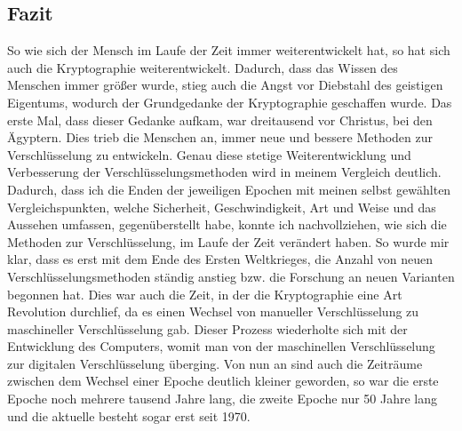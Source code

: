 \subsection{Fazit}
So wie sich der Mensch im Laufe der Zeit immer weiterentwickelt hat, so hat sich auch die Kryptographie weiterentwickelt. Dadurch, dass das Wissen des Menschen immer größer wurde, stieg auch die Angst vor Diebstahl des geistigen Eigentums, wodurch der Grundgedanke der Kryptographie geschaffen wurde. Das erste Mal, dass dieser Gedanke aufkam, war dreitausend vor Christus, bei den Ägyptern. Dies trieb die Menschen an, immer neue und bessere Methoden zur Verschlüsselung zu entwickeln. Genau diese stetige Weiterentwicklung und Verbesserung der Verschlüsselungsmethoden wird in meinem Vergleich deutlich. Dadurch, dass ich die Enden der jeweiligen Epochen mit meinen selbst gewählten Vergleichspunkten, welche Sicherheit, Geschwindigkeit, Art und Weise und das Aussehen umfassen, gegenüberstellt habe, konnte ich nachvollziehen, wie sich die Methoden zur Verschlüsselung, im Laufe der Zeit verändert haben. So wurde mir klar, dass es erst mit dem Ende des Ersten Weltkrieges, die Anzahl von neuen Verschlüsselungsmethoden ständig anstieg bzw. die Forschung an neuen Varianten begonnen hat. Dies war auch die Zeit, in der die Kryptographie eine Art Revolution durchlief, da es einen Wechsel von manueller Verschlüsselung zu maschineller Verschlüsselung gab. Dieser Prozess wiederholte sich mit der Entwicklung des Computers, womit man von der maschinellen Verschlüsselung zur digitalen Verschlüsselung überging. Von nun an sind auch die Zeiträume zwischen dem Wechsel einer Epoche deutlich kleiner geworden, so war die erste Epoche noch mehrere tausend Jahre lang, die zweite Epoche nur 50 Jahre lang und die aktuelle besteht sogar erst seit 1970.